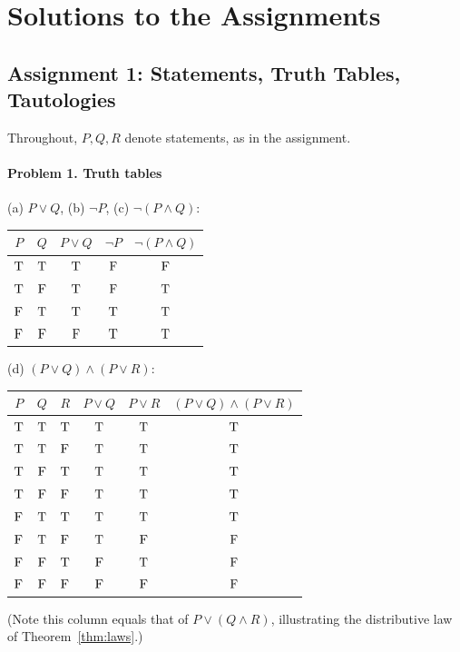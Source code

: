 \part{Solutions to the Assignments}

\chapter{Assignment 1: Statements, Truth Tables, Tautologies}\label{ch:sol1}

Throughout, $P,Q,R$ denote statements, as in the assignment.

\subsection*{Problem 1. Truth tables}

\noindent(a) $P\vee Q$, (b) $\neg P$, (c) $\neg(P\wedge Q)$:
\begin{center}
	\begin{tabular}{cc|c|c|c}
		\toprule
		$P$ & $Q$ & $P\vee Q$ & $\neg P$ & $\neg(P\wedge Q)$\\
		\midrule
		$\mathrm{T}$&$\mathrm{T}$&$\mathrm{T}$&$\mathrm{F}$&$\mathrm{F}$\\
		$\mathrm{T}$&$\mathrm{F}$&$\mathrm{T}$&$\mathrm{F}$&$\mathrm{T}$\\
		$\mathrm{F}$&$\mathrm{T}$&$\mathrm{T}$&$\mathrm{T}$&$\mathrm{T}$\\
		$\mathrm{F}$&$\mathrm{F}$&$\mathrm{F}$&$\mathrm{T}$&$\mathrm{T}$\\
		\bottomrule
	\end{tabular}
\end{center}

\noindent(d) $(P\vee Q)\wedge(P\vee R)$:
\begin{center}
	\begin{tabular}{ccc|c|c|c}
		\toprule
		$P$&$Q$&$R$&$P\vee Q$&$P\vee R$&$(P\vee Q)\wedge(P\vee R)$\\
		\midrule
		$\mathrm{T}$&$\mathrm{T}$&$\mathrm{T}$&$\mathrm{T}$&$\mathrm{T}$&$\mathrm{T}$\\
		$\mathrm{T}$&$\mathrm{T}$&$\mathrm{F}$&$\mathrm{T}$&$\mathrm{T}$&$\mathrm{T}$\\
		$\mathrm{T}$&$\mathrm{F}$&$\mathrm{T}$&$\mathrm{T}$&$\mathrm{T}$&$\mathrm{T}$\\
		$\mathrm{T}$&$\mathrm{F}$&$\mathrm{F}$&$\mathrm{T}$&$\mathrm{T}$&$\mathrm{T}$\\
		$\mathrm{F}$&$\mathrm{T}$&$\mathrm{T}$&$\mathrm{T}$&$\mathrm{T}$&$\mathrm{T}$\\
		$\mathrm{F}$&$\mathrm{T}$&$\mathrm{F}$&$\mathrm{T}$&$\mathrm{F}$&$\mathrm{F}$\\
		$\mathrm{F}$&$\mathrm{F}$&$\mathrm{T}$&$\mathrm{F}$&$\mathrm{T}$&$\mathrm{F}$\\
		$\mathrm{F}$&$\mathrm{F}$&$\mathrm{F}$&$\mathrm{F}$&$\mathrm{F}$&$\mathrm{F}$\\
		\bottomrule
	\end{tabular}
\end{center}
(Note this column equals that of $P\vee(Q\wedge R)$, illustrating the distributive law of Theorem~\ref{thm:laws}.)


